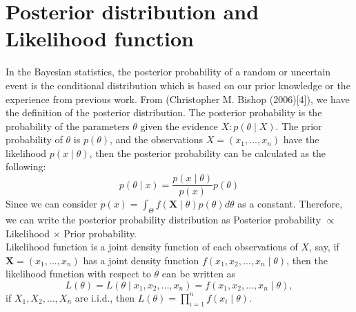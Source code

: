 \documentclass[mstat,12pt]{unswthesis}  %
\numberwithin{equation}{section}
\begin{document}
\section{Posterior distribution and Likelihood function}
In the Bayesian statistics, the posterior probability of a random or uncertain event is the conditional distribution which is based on our prior knowledge or the experience from previous work. From (Christopher M. Bishop (2006)[4]), we have the definition of the posterior distribution.
The posterior probability is the probability of the parameters $\theta$ given the evidence $X: p(\theta \mid X)$. The prior probability of $\theta$ is $p(\theta)$, and the observations $X = (x_1,...,x_n)$ have the likelihood $p(x \mid \theta)$, then the posterior probability can be calculated as the following:
\begin{equation}
    p(\theta \mid x)=\frac{p(x \mid \theta)}{p(x)} p(\theta)
\end{equation}
Since we can consider $p(x) = \int_{\Theta} f(\mathbf{X} \mid \theta) p(\theta) d \theta$ as a constant. Therefore, we can write the posterior probability distribution as 
Posterior probability $\propto$ Likelihood $\times$ Prior probability.\\
Likelihood function is a joint density function of each observations of $X$, say, if $\boldsymbol{X} = (x_1,...,x_n)$ has a joint density function $f\left(x_{1}, x_{2}, \ldots, x_{n} \mid \theta\right)$, then the likelihood function with respect to $\theta$ can be written as
\begin{equation}
    L(\theta)=L\left(\theta \mid x_{1}, x_{2}, \ldots, x_{n}\right)=f\left(x_{1}, x_{2}, \ldots, x_{n} \mid \theta\right),
\end{equation}
if $X_{1}, X_{2}, \ldots, X_{n}$ are i.i.d., then $L(\theta)=\prod_{i=1}^{n} f\left(x_{i} \mid \theta\right)$.
\end{document}
